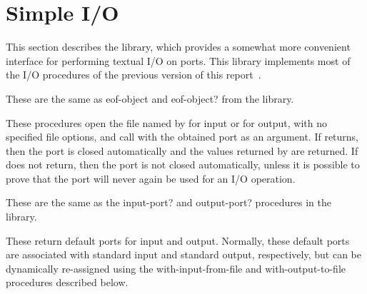 \section{Simple I/O}
\label{simpleiosection}

This section describes the  library, which
provides a somewhat more convenient interface for performing textual
I/O on ports.  This library implements most of the 
I/O procedures of the previous version of this report~\cite{R5RS}.

\begin{entry}{%
}

These are the same as {\cf eof-object} and {\cf eof-object?} from the
 library.
\end{entry}

\begin{entry}{%
}

These procedures open the file named by  for input or
for output, with no specified file options, and call  with
the obtained port as an argument.  If  returns, then the
port is closed automatically and the values returned by  are
returned. If  does not return, then the port is not
closed automatically, unless it is possible to prove that the port
will never again be used for an I/O operation.
\end{entry}

\begin{entry}{%
}

These are the same as the {\cf input-port?} and {\cf output-port?}
procedures in the  library.
\end{entry}

\begin{entry}{%
}

These return default ports for input and output.  Normally, these
default ports are associated with standard input and standard output,
respectively, but can be dynamically re-assigned using the {\cf
  with-input-from-file} and {\cf with-output-to-file} procedures
described below.
\end{entry}

